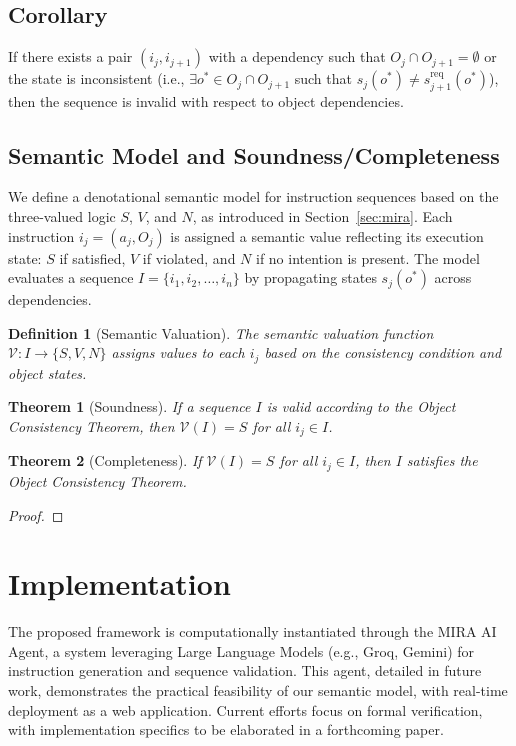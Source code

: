 \documentclass[a4paper,11pt]{lmcs}
\newtheorem{theorem}{Theorem}
\newtheorem{definition}{Definition}
\begin{document}
\subsection*{Corollary}
If there exists a pair \((i_j, i_{j+1})\) with a dependency such that \(O_j \cap O_{j+1} = \emptyset\) or the state is inconsistent (i.e., \(\exists o^* \in O_j \cap O_{j+1}\) such that \(s_j(o^*) \neq s_{j+1}^{\mathrm{req}}(o^*)\)), then the sequence is invalid with respect to object dependencies.

\subsection{Semantic Model and Soundness/Completeness}
\label{sec:semantics}

We define a denotational semantic model for instruction sequences based on the three-valued logic \( S \), \( V \), and \( N \), as introduced in Section~\ref{sec:mira}. Each instruction \( i_j = (a_j, O_j) \) is assigned a semantic value reflecting its execution state: \( S \) if satisfied, \( V \) if violated, and \( N \) if no intention is present. The model evaluates a sequence \( I = \{i_1, i_2, \ldots, i_n\} \) by propagating states \( s_j(o^*) \) across dependencies.

\begin{definition}[Semantic Valuation]
The semantic valuation function \( \mathcal{V}: I \rightarrow \{S, V, N\} \) assigns values to each \( i_j \) based on the consistency condition and object states.
\end{definition}

\begin{theorem}[Soundness]
If a sequence \( I \) is valid according to the Object Consistency Theorem, then \( \mathcal{V}(I) = S \) for all \( i_j \in I \).
\end{theorem}

\begin{theorem}[Completeness]
If \( \mathcal{V}(I) = S \) for all \( i_j \in I \), then \( I \) satisfies the Object Consistency Theorem.
\end{theorem}

\begin{proof}
\end{proof}

\section{Implementation}
The proposed framework is computationally instantiated through the MIRA AI Agent, a system leveraging Large Language Models (e.g., Groq, Gemini) for instruction generation and sequence validation. This agent, detailed in future work, demonstrates the practical feasibility of our semantic model, with real-time deployment as a web application. Current efforts focus on formal verification, with implementation specifics to be elaborated in a forthcoming paper.
\end{document}
